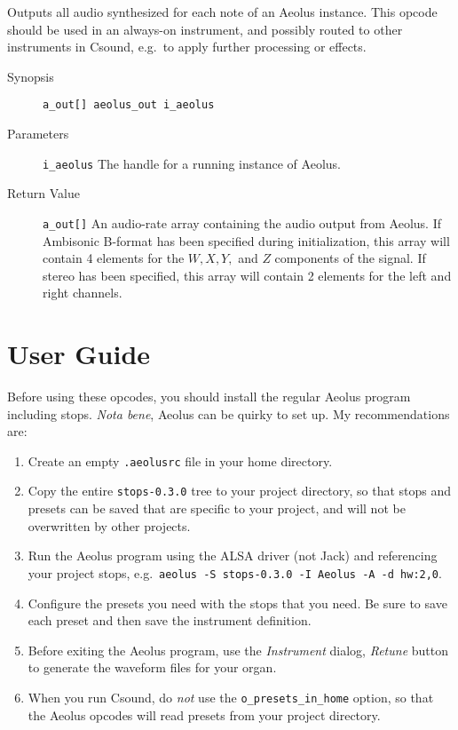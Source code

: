 \documentclass[english,11pt,letterpaper,onecolumn]{scrartcl}
\begin{document}
{Outputs all audio synthesized for each note of an Aeolus instance. This opcode should be used in an always-on instrument, and possibly routed to other instruments in Csound, e.g.\ to apply further processing or effects.

\begin{description}
	\item[Synopsis]
	\item[]\lstinline|a_out[] aeolus_out i_aeolus|
	\item[Parameters]
	\item[]\lstinline|i_aeolus| The handle for a running instance of Aeolus.
	\item[Return Value]
	\item[]\lstinline|a_out[]| An audio-rate array containing the audio output from Aeolus. If Ambisonic B-format has been specified during initialization, this array will contain 4 elements for the $W, X, Y,$ and $Z$ components of the signal. If stereo has been specified, this array will contain 2 elements for the left and right channels.
\end{description}

\section{User Guide}

Before using these opcodes, you should install the regular Aeolus program including stops. \emph{Nota bene}, Aeolus can be quirky to set up. My recommendations are:

\begin{enumerate}
	\item Create an empty \lstinline|.aeolusrc| file in your home directory.
	\item Copy the entire \lstinline|stops-0.3.0| tree to your project directory, so that stops and presets can be saved that are specific to your project, and will
    not be overwritten by other projects.
	\item Run the Aeolus program using the ALSA driver (not Jack) and referencing your project stops, e.g.\ \lstinline|aeolus -S stops-0.3.0 -I Aeolus -A -d hw:2,0|.
	\item Configure the presets you need with the stops that you need. Be sure to save each preset and then save the instrument definition.
	\item Before exiting the Aeolus program, use the \emph{Instrument} dialog, \emph{Retune} button to generate the waveform files for your organ.
	\item When you run Csound, do \emph{not} use the \lstinline|o_presets_in_home| option, so that the Aeolus opcodes will read presets from your project directory.
\end{enumerate}

}
\end{document}
